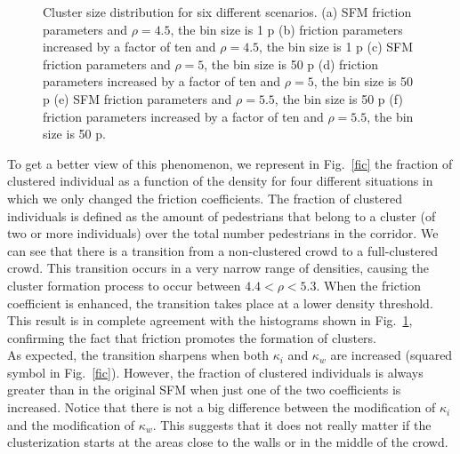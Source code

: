 \begin{figure}[!htbp]
\caption[width=0.47\columnwidth]{Cluster size distribution for six different scenarios. (a) SFM friction parameters and $\rho=4.5$, the bin size is 1 p (b) friction parameters increased by a factor of ten and $\rho=4.5$, the bin size is 1 p (c) SFM friction parameters and $\rho=5$, the bin size is 50 p (d) friction parameters increased by a factor of ten and $\rho=5$, the bin size is 50 p (e) SFM friction parameters and $\rho=5.5$, the bin size is 50 p (f) friction parameters increased by a factor of ten and $\rho=5.5$, the bin size is 50 p.}
\label{cluster_distribution}
\end{figure}

To get a better view of this phenomenon, we represent in Fig.~\ref{fic} the fraction of clustered individual as a function of the density for four different situations in which we only changed the friction coefficients. The fraction of clustered individuals is defined as the amount of pedestrians that belong to a cluster (of two or more individuals) over the total number pedestrians in the corridor. 
We can see that there is a transition from a non-clustered crowd to a full-clustered crowd. This transition occurs in a very narrow range of densities, causing the cluster formation process to occur between $4.4<\rho<5.3$. When the friction coefficient is enhanced, the transition takes place at a lower density threshold. This result is in complete agreement with the histograms shown in Fig.~\ref{cluster_distribution}, confirming the fact that friction promotes the formation of clusters.\\

As expected, the transition sharpens when both $\kappa_i$ and $\kappa_w$ are increased (squared symbol in Fig.~\ref{fic}). {\color{red} However, the fraction of clustered individuals is always greater than in the original SFM when just one of the
two coefficients is increased}. Notice that there is not a big difference between the modification of $\kappa_i$ and the modification of $\kappa_w$. This suggests that it does not really matter if the clusterization starts at the areas close to the walls or in the middle of the crowd.\\


